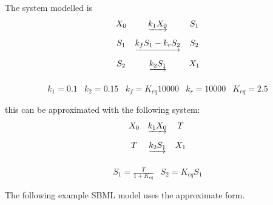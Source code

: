 \documentclass[10pt]{cekarticle}
\begin{document}
The system modelled is
\begin{equation*}
  \begin{array}{@{}ccc@{}}
    X_0 & \underrightarrow{k_1 X_0} & S_1 \\ \\[-4pt]
    S_1 & \underrightarrow{k_f S_1 - k_r S_2} & S_2 \\ \\[-4pt]
    S_2 & \underrightarrow{k_2 S_1} & X_1\\ \\[-4pt]
  \end{array}
\end{equation*}
\begin{equation*}
  \begin{array}{lllll}
    k_1 = 0.1 & k_2 = 0.15 & k_f = K_{eq} 10000 & k_r = 10000 & K_{eq} = 2.5\\ \\[-4pt]
  \end{array}
\end{equation*}
this can be approximated with the following system:
\begin{equation*}
  \begin{array}{@{}ccc@{}}
    X_0 & \underrightarrow{k_1 X_0} & T \\ \\[-4pt]
    T & \underrightarrow{k_2 S_1} & X_1\\ \\[-4pt]
  \end{array}
\end{equation*}
\begin{equation*}
  \begin{array}{ll}
    S_1 = \frac{T}{1 + K_{eq}} & S_2 = K_{eq} S_1\\ \\[-4pt]
  \end{array}
\end{equation*}
The following example SBML model uses the approximate form.
\end{document}
